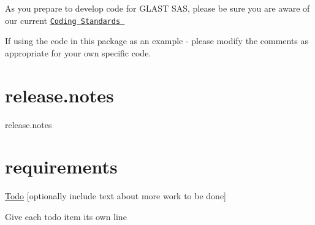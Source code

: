 As you prepare to develop code for GLAST SAS, please be sure you are aware of our current \href{http://www-glast.slac.stanford.edu/software/CodeHowTo/codeStandards.html}{\tt Coding Standards }

If using the code in this package as an example -\/ please modify the comments as appropriate for your own specific code.



 \hypertarget{index_notes}{}\section{release.notes}\label{index_notes}
release.notes 

 \hypertarget{index_requirements}{}\section{requirements}\label{index_requirements}

\begin{DoxyVerbInclude}
\end{DoxyVerbInclude}
 

 \begin{Desc}
\item[\hyperlink{todo__todo000001}{Todo}]\mbox{[}optionally include text about more work to be done\mbox{]} 

Give each todo item its own line\end{Desc}
